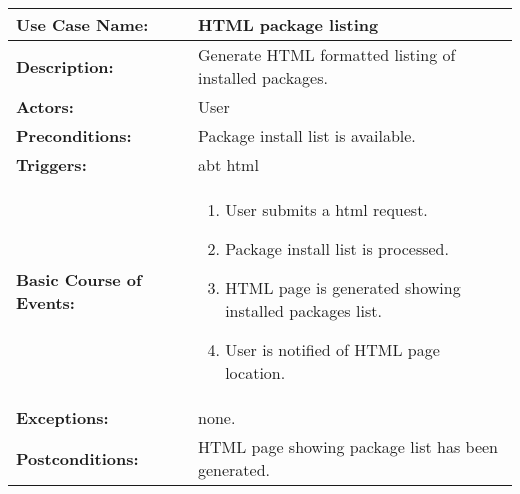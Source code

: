 
\begin{tabularx}{\linewidth}{|l|X|}
\hline
\textbf{Use Case Name:} & \textbf{HTML package listing} \\
\hline
\textbf{Description:} & 
Generate HTML formatted listing of installed packages. \\
\hline
\textbf{Actors:} & User \\
\hline
\textbf{Preconditions:} & 
Package install list is available. \\
\hline
\textbf{Triggers:} & abt html \\
\hline
\textbf{Basic Course of Events:} & 
\begin{minipage}{\linewidth} 
  \vspace{0.05em}
  \begin{enumerate}
    \item User submits a html request.
    \item Package install list is processed.
    \item HTML page is generated showing installed packages list.
    \item User is notified of HTML page location.
  \end{enumerate}
  \vspace{0.05em}
\end{minipage}
\\
\hline
\textbf{Exceptions:} & none. \\
\hline 
\textbf{Postconditions:} &
HTML page showing package list has been generated.
\\
\hline
\end{tabularx}


